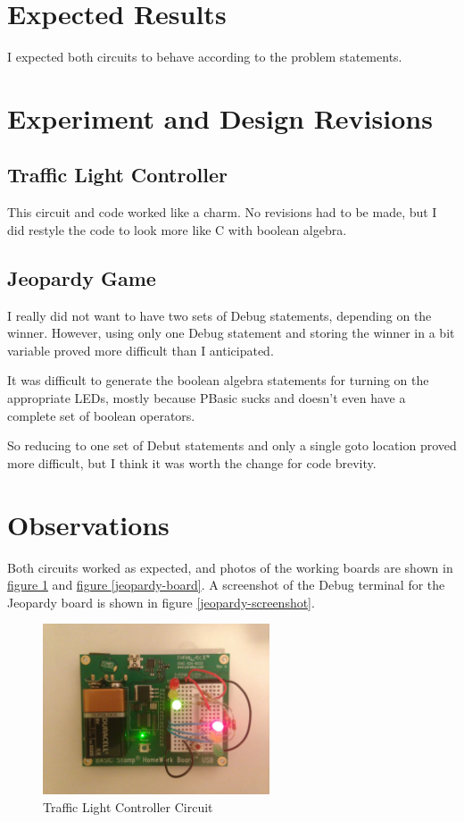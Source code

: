\documentclass[11pt]{article}
\begin{document}
\section{Expected Results}

I expected both circuits to behave according to the problem statements.

\section{Experiment and Design Revisions}

\subsection{Traffic Light Controller}

This circuit and code worked like a charm.
No revisions had to be made, but I did restyle the code to look more like C with boolean algebra.

\subsection{Jeopardy Game}

I really did not want to have two sets of Debug statements, depending on the winner.
However, using only one Debug statement and storing the winner in a bit variable proved more difficult than I anticipated.

It was difficult to generate the boolean algebra statements for turning on the appropriate LEDs,
mostly because PBasic sucks and doesn't even have a complete set of boolean operators.

So reducing to one set of Debut statements and only a single goto location proved more difficult,
but I think it was worth the change for code brevity.

\section{Observations}

Both circuits worked as expected, and photos of the working boards are shown in
\hyperref[traffic-light]{figure \ref{traffic-light}}
and \hyperref[jeopardy-board]{figure \ref{jeopardy-board}}.
A screenshot of the Debug terminal for the Jeopardy board is shown in figure \ref{jeopardy-screenshot}.

\begin{figure}
\centering
\includegraphics[width=0.6\textwidth]{traffic-light.jpg}
\caption{Traffic Light Controller Circuit}
\label{traffic-light}
\end{figure}
\end{document}
